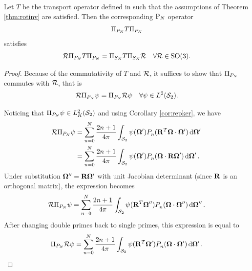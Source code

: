 \begin{theorem}\label{thm:commut_PN}
Let $T$ be the transport operator defined in  such that the assumptions of Theorem
\ref{thm:rotinv} are satisfied. 
Then the corresponding $\PN$ operator
\begin{equation*}
	\Projop\op{T}\Projop
\end{equation*}
satisfies 
$$
\genop{R}\Projop\op{T}\Projop = \Projop[S_N]\op{T}\Projop[S_N]\genop{R}\quad \forall
\genop{R}\in\mathrm{SO}(3). 
$$
\end{theorem}
\begin{proof}
Because of the commutativity of $T$ and $\genop{R}$, it suffices to show that $\Projop$ commutes
with $\genop{R}$, that is 
\begin{equation}\label{eq:thm1_point}
	\genop{R} \Projop \psi = \Projop \genop{R} \psi\quad  \forall \psi \in \Lp[2](\Sphere).
\end{equation}

\noindent Noticing that $\Projop\psi \in \Lp[2]_K(\Sphere)$ and using Corollary \ref{cor:repker}, we have
$$
\begin{aligned}
	\genop{R} \Projop \psi &= 
	\sum_{n=0}^{N} \frac{2n+1}{4\pi} \intA[']{\psi(\bomega')\P{n}{}(\mat{R}^T\bomega\cdot\bomega')}\\ 
	&= \sum_{n=0}^{N} \frac{2n+1}{4\pi}
	\intA[']{\psi(\bomega')\P{n}{}(\bomega\cdot\mat{R}\bomega')}.
\end{aligned}
$$
Under substitution $\bomega'' = \mat{R}\bomega'$ with unit Jacobian determinant (since $\mat{R}$ is an orthogonal
matrix), the expression becomes
$$
	\genop{R} \Projop \psi = \sum_{n=0}^{N} \frac{2n+1}{4\pi}
	\intA['']{\psi(\mat{R}^T\bomega'')\P{n}{}(\bomega\cdot\bomega'')}.
$$
After changing double primes back to single primes, this expression is equal to
$$
	\Projop \genop{R}\psi = \sum_{n=0}^{N} \frac{2n+1}{4\pi}
	\intA[']{\psi(\mat{R}^T\bomega')\P{n}{}(\bomega\cdot\bomega')}.
$$
\end{proof}




